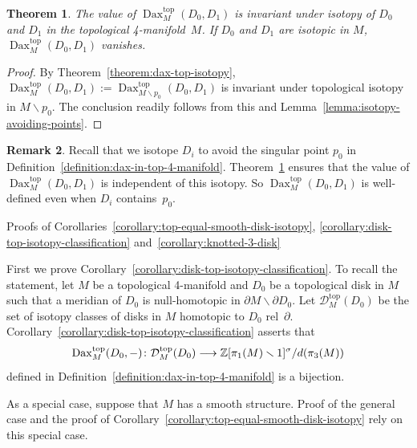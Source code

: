 \documentclass[11pt]{amsart}
\makeatletter
\def\section{\@startsection{section}{1}%
  \z@{-1.4\linespacing\@plus-.5\linespacing}{.8\linespacing}%
  {\normalfont\bfseries\Large\raggedright}}
\def\to{\mathchoice{\longrightarrow}{\rightarrow}{\rightarrow}{\rightarrow}}
\newtheorem{theorem}{Theorem}[section]
\theoremstyle{definition}
\newtheorem{remark}[theorem]{Remark}
\theoremstyle{theorem-giventitle}
\theoremstyle{definition-giventitle}
\numberwithin{equation}{section}
\def\Z{\mathbb{Z}}
\def\cD{\mathcal{D}}
\def\top{\mathrm{top}}
\def\Dax{\operatorname{Dax}}
\def\setminus{\smallsetminus}
\makeatother
\begin{document}
\begin{theorem}
  \label{theorem:dax-in-top-4-manifold-isotopy}
  The value of $\Dax^\top_M(D_0,D_1)$ is invariant under isotopy of $D_0$ and $D_1$ in the topological 4-manifold~$M$.
  If $D_0$ and $D_1$ are isotopic in $M$, $\Dax^\top_M(D_0,D_1)$ vanishes.
\end{theorem}

\begin{proof}
  By Theorem~\ref{theorem:dax-top-isotopy}, $\Dax^\top_M(D_0,D_1):=\Dax^\top_{M\setminus p_0}(D_0,D_1)$ is invariant under topological isotopy in $M\setminus p_0$.
  The conclusion readily follows from this and Lemma~\ref{lemma:isotopy-avoiding-points}.
\end{proof}

\begin{remark}
  Recall that we isotope $D_i$ to avoid the singular point $p_0$ in Definition~\ref{definition:dax-in-top-4-manifold}.
  Theorem~\ref{theorem:dax-in-top-4-manifold-isotopy} ensures that the value of $\Dax^\top_M(D_0,D_1)$ is independent of this isotopy.
  So $\Dax^\top_M(D_0,D_1)$ is well-defined even when $D_i$ contains~$p_0$.
\end{remark}



\section{Proofs of Corollaries~\ref{corollary:top-equal-smooth-disk-isotopy}, \ref{corollary:disk-top-isotopy-classification} and~\ref{corollary:knotted-3-disk}}
\label{section:proof-top=smooth-for-disk}


First we prove Corollary~\ref{corollary:disk-top-isotopy-classification}\@.
To recall the statement, let $M$ be a topological 4-manifold and $D_0$ be a topological disk in $M$ such that a meridian of $D_0$ is null-homotopic in $\partial M \setminus \partial D_0$.
Let $\cD^\top_M(D_0)$ be the set of isotopy classes of disks in $M$ homotopic to $D_0$ rel~$\partial$.
Corollary~\ref{corollary:disk-top-isotopy-classification} asserts that
\[
  \Dax^\top_M(D_0,-)\colon
  \cD^\top_M(D_0)
  \to
  \Z[\pi_1(M)\setminus 1]^\sigma / d(\pi_3(M))
\]
defined in Definition~\ref{definition:dax-in-top-4-manifold} is a bijection.

As a special case, suppose that $M$ has a smooth structure.
Proof of the general case and the proof of Corollary~\ref{corollary:top-equal-smooth-disk-isotopy} rely on this special case.
\end{document}
